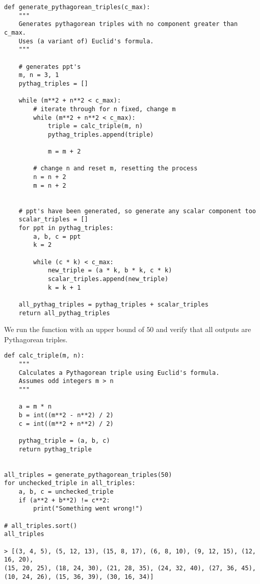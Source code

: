 \documentclass[12pt]{article}
\begin{document}
\begin{verbatim}
def generate_pythagorean_triples(c_max):
    """
    Generates pythagorean triples with no component greater than c_max.
    Uses (a variant of) Euclid's formula.
    """

    # generates ppt's
    m, n = 3, 1
    pythag_triples = []

    while (m**2 + n**2 < c_max):
        # iterate through for n fixed, change m
        while (m**2 + n**2 < c_max):
            triple = calc_triple(m, n)
            pythag_triples.append(triple)

            m = m + 2

        # change n and reset m, resetting the process
        n = n + 2
        m = n + 2 


    # ppt's have been generated, so generate any scalar component too
    scalar_triples = []
    for ppt in pythag_triples:
        a, b, c = ppt
        k = 2

        while (c * k) < c_max:
            new_triple = (a * k, b * k, c * k)
            scalar_triples.append(new_triple)
            k = k + 1
            
    all_pythag_triples = pythag_triples + scalar_triples
    return all_pythag_triples
\end{verbatim}
We run the function with an upper bound of $50$ and verify that all outputs are Pythagorean triples.
\begin{verbatim}
def calc_triple(m, n):
    """
    Calculates a Pythagorean triple using Euclid's formula.
    Assumes odd integers m > n
    """
    
    a = m * n
    b = int((m**2 - n**2) / 2)
    c = int((m**2 + n**2) / 2)

    pythag_triple = (a, b, c)
    return pythag_triple


all_triples = generate_pythagorean_triples(50)
for unchecked_triple in all_triples:
    a, b, c = unchecked_triple
    if (a**2 + b**2) != c**2:
        print("Something went wrong!")

# all_triples.sort()
all_triples

> [(3, 4, 5), (5, 12, 13), (15, 8, 17), (6, 8, 10), (9, 12, 15), (12, 16, 20),
(15, 20, 25), (18, 24, 30), (21, 28, 35), (24, 32, 40), (27, 36, 45), 
(10, 24, 26), (15, 36, 39), (30, 16, 34)]


\end{verbatim}
\end{document}
